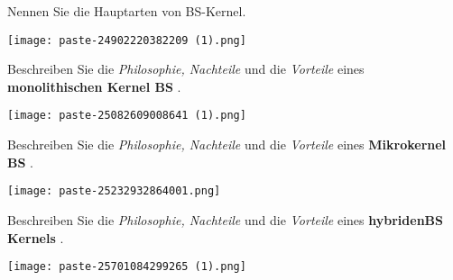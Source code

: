 \documentclass{article}
\begin{document}
\begin{tcolorbox}[colback=white!10!white,colframe=lightgray!75!black,
  savelowerto=\jobname_ex.tex,breakable,enhanced,lines before break=40]

\begin{center}
Nennen Sie die Hauptarten von BS-Kernel.

\end{center}

\tcblower

\justifying
\texttt{[image: paste-24902220382209 (1).png]}

\end{tcolorbox}
\begin{tcolorbox}[colback=white!10!white,colframe=lightgray!75!black,
  savelowerto=\jobname_ex.tex,breakable,enhanced,lines before break=40]

\begin{center}
Beschreiben Sie die 
\textit{Philosophie, Nachteile
}und die 
\textit{Vorteile
}eines 
\textbf{monolithischen Kernel BS
}.

\end{center}

\tcblower

\justifying
\texttt{[image: paste-25082609008641 (1).png]}

\end{tcolorbox}
\begin{tcolorbox}[colback=white!10!white,colframe=lightgray!75!black,
  savelowerto=\jobname_ex.tex,breakable,enhanced,lines before break=40]

\begin{center}
Beschreiben Sie die
\textit{Philosophie, Nachteile
}und die
\textit{Vorteile
}eines
\textbf{Mikrokernel BS
}.

\end{center}

\tcblower

\justifying
\texttt{[image: paste-25232932864001.png]}

\end{tcolorbox}
\begin{tcolorbox}[colback=white!10!white,colframe=lightgray!75!black,
  savelowerto=\jobname_ex.tex,breakable,enhanced,lines before break=40]

\begin{center}
Beschreiben Sie die
\textit{Philosophie, Nachteile
}und die
\textit{Vorteile
}eines 
\textbf{hybridenBS Kernels
}.

\end{center}

\tcblower

\justifying
\texttt{[image: paste-25701084299265 (1).png]}

\end{tcolorbox}
\end{document}
